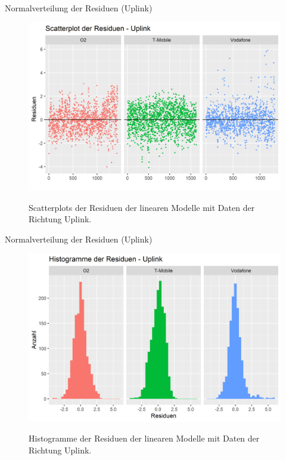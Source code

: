 \documentclass[10pt]{beamer}
\begin{document}
\begin{frame}{Normalverteilung der Residuen (Uplink)}
	\begin{figure}
		\includegraphics[scale=0.35]{plots/arima/uplink/res_scatter}\\
		\caption{Scatterplots der Residuen der linearen Modelle mit Daten der Richtung Uplink.}
		\label{res_scatter}
	\end{figure}
\end{frame}
\begin{frame}{Normalverteilung der Residuen (Uplink)}
	\begin{figure}
		\includegraphics[scale=0.35]{plots/arima/uplink/res_histogram}\\
		\caption{Histogramme der Residuen der linearen Modelle mit Daten der Richtung Uplink.}
		\label{res_histogram}
	\end{figure}
\end{frame}
\end{document}

